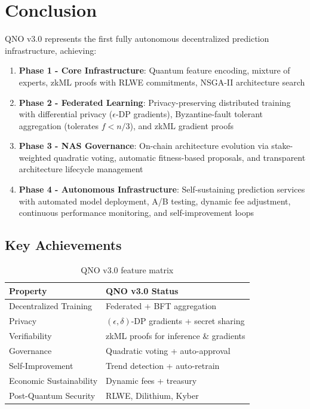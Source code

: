 \documentclass[11pt,a4paper]{article}
\begin{document}
\section{Conclusion}

QNO v3.0 represents the first fully autonomous decentralized prediction infrastructure, achieving:

\begin{enumerate}
    \item \textbf{Phase 1 - Core Infrastructure}: Quantum feature encoding, mixture of experts, zkML proofs with RLWE commitments, NSGA-II architecture search

    \item \textbf{Phase 2 - Federated Learning}: Privacy-preserving distributed training with differential privacy ($\epsilon$-DP gradients), Byzantine-fault tolerant aggregation (tolerates $f < n/3$), and zkML gradient proofs

    \item \textbf{Phase 3 - NAS Governance}: On-chain architecture evolution via stake-weighted quadratic voting, automatic fitness-based proposals, and transparent architecture lifecycle management

    \item \textbf{Phase 4 - Autonomous Infrastructure}: Self-sustaining prediction services with automated model deployment, A/B testing, dynamic fee adjustment, continuous performance monitoring, and self-improvement loops
\end{enumerate}

\subsection{Key Achievements}

\begin{table}[h]
\centering
\begin{tabular}{ll}
\toprule
\textbf{Property} & \textbf{QNO v3.0 Status} \\
\midrule
Decentralized Training & Federated + BFT aggregation \\
Privacy & $(\epsilon, \delta)$-DP gradients + secret sharing \\
Verifiability & zkML proofs for inference \& gradients \\
Governance & Quadratic voting + auto-approval \\
Self-Improvement & Trend detection + auto-retrain \\
Economic Sustainability & Dynamic fees + treasury \\
Post-Quantum Security & RLWE, Dilithium, Kyber \\
\bottomrule
\end{tabular}
\caption{QNO v3.0 feature matrix}
\end{table}
\end{document}
